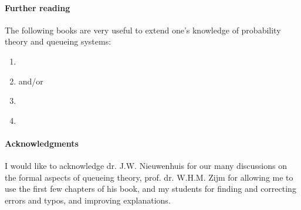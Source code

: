 
\paragraph{Further reading}

The following books are very useful to extend one's knowledge of probability theory and queueing systems:
\begin{enumerate}
\item \citet{capinski03:_probab_probl}
\item \citet{tijms94:_stoch_model_algor_approac} and/or \citet{tijms03:_first_cours_stoch_model}
\item \citet{el-taha98:_sampl_path_analy_queuein_system}
\item \citet{bolch06:_queuein_networ_markov_chain}
\end{enumerate}



\paragraph{Acknowledgments}

I would like to acknowledge dr.
J.W.
Nieuwenhuis for our many discussions on the formal aspects of queueing theory, prof.
dr.
W.H.M.
Zijm for allowing me to use the first few chapters of his book, and my students for finding and correcting errors and typos, and improving explanations.




